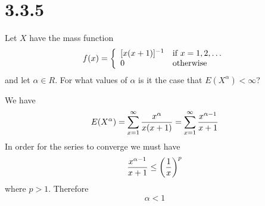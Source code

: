 \section*{3.3.5}
Let $X$ have the mass function
\begin{displaymath}
f(x)=\left\{
\begin{array}{ll}
[x(x+1)]^{-1} & \hbox{if $x=1,2,\ldots$} \\
0 & \hbox{otherwise}
\end{array}
\right.
\end{displaymath}
and let $\alpha\in R$. For what values of $\alpha$ is it the case
that $E(X^\alpha)<\infty$?

\bigskip
\noindent
We have
$$E(X^\alpha)=\sum_{x=1}^\infty{x^\alpha\over x(x+1)}
=\sum_{x=1}^\infty{x^{\alpha-1}\over x+1}$$
In order for the series to converge we must have
$${x^{\alpha-1}\over x+1}\le\left({1\over x}\right)^p$$
where $p>1$. Therefore
$$\alpha<1$$
